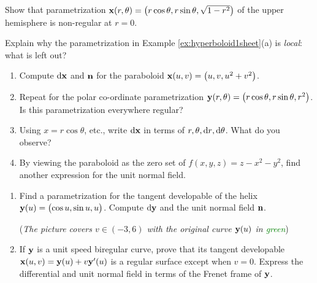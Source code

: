 \begin{exercises}
	\exstart Show that parametrization ${\mathbf{x}}(r,\theta)=\bigl(r\cos\theta,r\sin\theta,\sqrt{1-r^2}\bigr)$ of the upper hemisphere is non-regular at $r=0$.

	\begin{enumerate}\setcounter{enumi}{1}
	  \item Explain why the parametrization in Example \ref{ex:hyperboloid1sheet}(a) is \emph{local}: what is left out?
	  
	  \item\label{exs:paraboloid}\begin{enumerate}
	    \item Compute $\mathrm{d}{\mathbf{x}}$ and ${\mathbf{n}}$ for the paraboloid ${\mathbf{x}}(u,v)=\bigl(u,v,u^2+v^2\bigr)$.
	  	\item Repeat for the polar co-ordinate parametrization ${\mathbf{y}}(r,\theta)=\bigl(r\cos\theta,r\sin\theta,r^2\bigr)$. Is this parametrization everywhere regular?
			\item Using $x=r\cos\theta$, etc., write $\mathrm{d}{\mathbf{x}}$ in terms of $r,\theta,{\mathrm{d} r},{\mathrm{d}\theta}$. What do you observe?
			\item By viewing the paraboloid as the zero set of $f(x,y,z)=z-x^2-y^2$, find another expression for the unit normal field.
		\end{enumerate}
	
	  \begin{minipage}[t]{0.77\linewidth}\vspace{0pt}
			\item\label{exs:tandev}
			\begin{enumerate}
			  \item Find a parametrization for the tangent developable of the helix ${\mathbf{y}}(u)=\bigl(\cos u,\sin u,u\bigr)$. Compute $\mathrm{d}{\mathbf{y}}$ and the unit normal field ${\mathbf{n}}$.\par
	    (\emph{The picture covers $v\in(-3,6)$ with the original curve ${\mathbf{y}}(u)$ in \textcolor{Green}{green}})
	    	\item If ${\mathbf{y}}$ is a unit speed biregular curve, prove that its tangent developable ${\mathbf{x}}(u,v)={\mathbf{y}}(u)+v{\mathbf{y}}'(u)$ is a regular surface except when $v=0$. Express the differential and unit normal field in terms of the Frenet frame of ${\mathbf{y}}$.
	    \end{enumerate}
	  

\end{minipage}
\end{enumerate}
\end{exercises}
